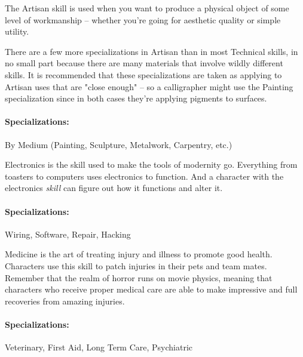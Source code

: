 
\hspace{\parindent} The Artisan skill is used when you want to produce a physical object of some level of workmanship -- whether you're going for aesthetic quality or simple utility. 

There are a few more specializations in Artisan than in most Technical skills, in no small part because there are many materials that involve wildly different skills. It is recommended that these specializations are taken as applying to Artisan uses that are "close enough" -- so a calligrapher might use the Painting specialization since in both cases they're applying pigments to surfaces.

\paragraph{Specializations:} By Medium (Painting, Sculpture, Metalwork, Carpentry, etc.)


\hspace{\parindent} Electronics is the skill used to make the tools of modernity go. Everything from toasters to computers uses electronics to function. And a character with the electronics \textit{skill} can figure out how it functions and alter it.

\paragraph{Specializations:} Wiring, Software, Repair, Hacking


\hspace{\parindent} Medicine is the art of treating injury and illness to promote good health. Characters use this skill to patch injuries in their pets and team mates. Remember that the realm of horror runs on movie physics, meaning that characters who receive proper medical care are able to make impressive and full recoveries from amazing injuries.

\paragraph{Specializations:} Veterinary, First Aid, Long Term Care, Psychiatric

